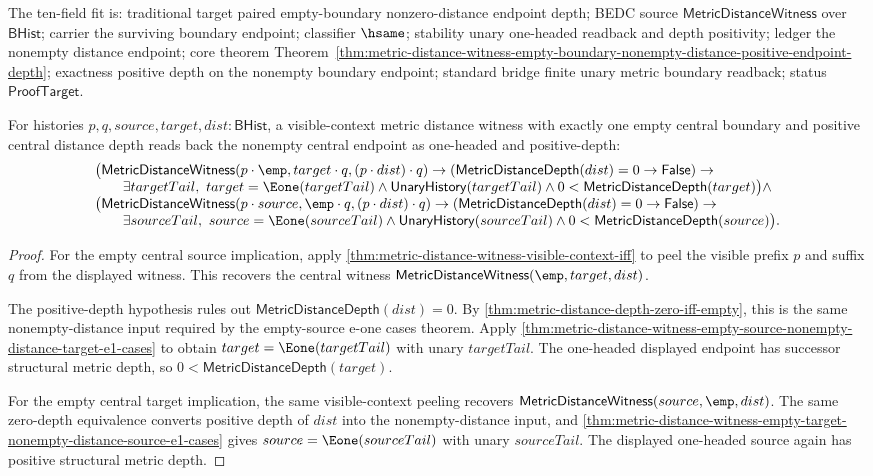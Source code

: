 The ten-field fit is: traditional target paired empty-boundary nonzero-distance
endpoint depth; BEDC source $\mathsf{MetricDistanceWitness}$ over
$\mathsf{BHist}$; carrier the surviving boundary endpoint; classifier
$\hsame$; stability unary one-headed readback and depth positivity; ledger the
nonempty distance endpoint; core theorem
Theorem~\ref{thm:metric-distance-witness-empty-boundary-nonempty-distance-positive-endpoint-depth};
exactness positive depth on the nonempty boundary endpoint; standard bridge
finite unary metric boundary readback; status $\mathsf{ProofTarget}$.

\begin{theorem}
\label{thm:metric-distance-witness-visible-boundary-positive-depth-endpoint-readback}
For histories $p,q,source,target,dist:\mathsf{BHist}$, a visible-context
metric distance witness with exactly one empty central boundary and positive
central distance depth reads back the nonempty central endpoint as one-headed
and positive-depth:
$$
\begin{array}{l}
\bigl(
\mathsf{MetricDistanceWitness}(p\cdot\emp,target\cdot q,(p\cdot dist)\cdot q)
\to
(\mathsf{MetricDistanceDepth}(dist)=0\to\mathsf{False})
\to\\
\qquad
\exists targetTail,\ target=\Eone(targetTail)\land
\mathsf{UnaryHistory}(targetTail)\land
0<\mathsf{MetricDistanceDepth}(target)
\bigr)
\land\\
\bigl(
\mathsf{MetricDistanceWitness}(p\cdot source,\emp\cdot q,(p\cdot dist)\cdot q)
\to
(\mathsf{MetricDistanceDepth}(dist)=0\to\mathsf{False})
\to\\
\qquad
\exists sourceTail,\ source=\Eone(sourceTail)\land
\mathsf{UnaryHistory}(sourceTail)\land
0<\mathsf{MetricDistanceDepth}(source)
\bigr).
\end{array}
$$
\end{theorem}
\begin{proof}
For the empty central source implication, apply
\autoref{thm:metric-distance-witness-visible-context-iff} to peel the visible
prefix $p$ and suffix $q$ from the displayed witness. This recovers the central
witness $\mathsf{MetricDistanceWitness}(\emp,target,dist)$.

The positive-depth hypothesis rules out
$\mathsf{MetricDistanceDepth}(dist)=0$. By
\autoref{thm:metric-distance-depth-zero-iff-empty}, this is the same
nonempty-distance input required by the empty-source e-one cases theorem.
Apply
\autoref{thm:metric-distance-witness-empty-source-nonempty-distance-target-e1-cases}
to obtain $target=\Eone(targetTail)$ with unary $targetTail$. The one-headed
displayed endpoint has successor structural metric depth, so
$0<\mathsf{MetricDistanceDepth}(target)$.

For the empty central target implication, the same visible-context peeling
recovers $\mathsf{MetricDistanceWitness}(source,\emp,dist)$. The same
zero-depth equivalence converts positive depth of $dist$ into the
nonempty-distance input, and
\autoref{thm:metric-distance-witness-empty-target-nonempty-distance-source-e1-cases}
gives $source=\Eone(sourceTail)$ with unary $sourceTail$. The displayed
one-headed source again has positive structural metric depth.
\end{proof}
